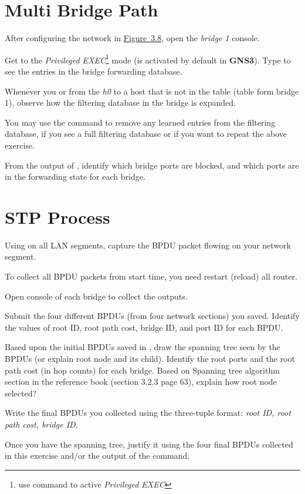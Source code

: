 \documentclass{../UTNetLab}
\begin{document}
\section{Multi Bridge Path}
After configuring the network in \hyperref[fig:3.8]{Figure~3.8}, open the \textit{bridge 1} console.

Get to the \textit{Privileged EXEC}\footnote{use  command to active \textit{Privileged EXEC}} mode (is activated by default in \textbf{GNS3}).
Type  to see the entries in the bridge forwarding database.

Whenever you  or  from the \textit{h0} to a host that is not in the table (table form bridge 1), observe how the filtering database in the bridge is expanded.

You may use the  command to remove any learned entries from the filtering database, if you see a full filtering database or if you want to repeat the above exercise.

\begin{report}
    \item From the output of , identify which bridge ports are blocked, and which ports are in the forwarding state for each bridge.
\end{report}

\section{STP Process}
Using  on all LAN segments, capture the BPDU packet flowing on your network segment.

To collect all BPDU packets from start time, you need restart (reload) all router.

Open console of each bridge to collect the  outputs.

\begin{report}
    \item Submit the four different BPDUs (from four network sections) you saved.
    Identify the values of root ID, root path cost, bridge ID, and port ID for each BPDU.

    \item Based upon the initial BPDUs saved in , draw the spanning tree seen by the BPDUs (or explain root node and its child).
    Identify the root ports and the root path cost (in hop counts) for each bridge.
    Based on Spanning tree algorithm section in the reference book (section 3.2.3 page 63), explain how root node selected?

    \item Write the final BPDUs you collected using the three-tuple format: \textit{{root ID, root path cost, bridge ID}}.

    \item Once you have the spanning tree, justify it using the four final BPDUs collected in this exercise and/or the output of the  command.
\end{report}
\end{document}
